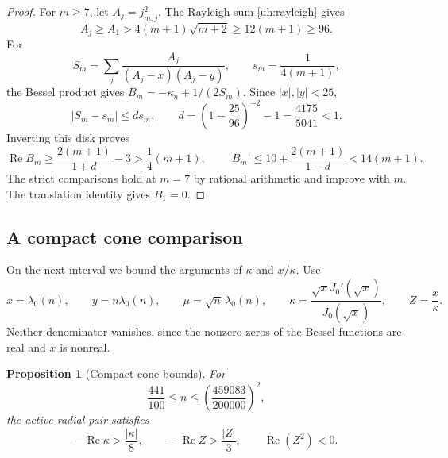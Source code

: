 \documentclass[a4paper,11pt]{amsart}
\numberwithin{equation}{section}
\theoremstyle{plain}
\newtheorem{proposition}[theorem]{Proposition}
\theoremstyle{definition}
\begin{document}
\begin{proof}
For \(m\ge7\), let \(A_j=j_{m,j}^2\). The Rayleigh sum \eqref{uh:rayleigh} gives
\[
 A_j\ge A_1>4(m+1)\sqrt{m+2}\ge12(m+1)\ge96.
\]
For
\[
 S_m=\sum_j\frac{A_j}{(A_j-x)(A_j-y)},\qquad
 s_m=\frac1{4(m+1)},
\]
the Bessel product gives \(B_m=-\kappa_n+1/(2S_m)\).
Since \(|x|,|y|<25\),
\[
 |S_m-s_m|\le d s_m,\qquad
 d=\left(1-\frac{25}{96}\right)^{-2}-1
   =\frac{4175}{5041}<1.
\]
Inverting this disk proves
\[
 \operatorname{Re}B_m
 \ge\frac{2(m+1)}{1+d}-3>\frac14(m+1),
 \qquad
 |B_m|\le10+\frac{2(m+1)}{1-d}<14(m+1).
\]
The strict comparisons hold at \(m=7\) by rational arithmetic
and improve with \(m\). The translation identity gives \(B_1=0\).
\end{proof}

\subsection{A compact cone comparison}
\label{uh:compact-section}

On the next interval we bound the arguments of \(\kappa\)
and \(x/\kappa\). Use
\[
 x=\lambda_0(n),\qquad y=n\lambda_0(n),\qquad
 \mu=\sqrt n\,\lambda_0(n),\qquad
 \kappa=\frac{\sqrt xJ_0'(\sqrt x)}{J_0(\sqrt x)},\qquad
 Z=\frac{x}{\kappa}.
\]
Neither denominator vanishes, since the nonzero zeros of the
Bessel functions are real and \(x\) is nonreal.

\begin{proposition}[Compact cone bounds]
\label{uh:compact-cones}
For
\[
 \frac{441}{100}\le n\le
       \left(\frac{459083}{200000}\right)^2,
\]
the active radial pair satisfies
\[
 -\operatorname{Re}\kappa>\frac{|\kappa|}{8},\qquad
 -\operatorname{Re}Z>\frac{|Z|}{3},\qquad
 \operatorname{Re}(Z^2)<0.
\]
\end{proposition}
\end{document}
